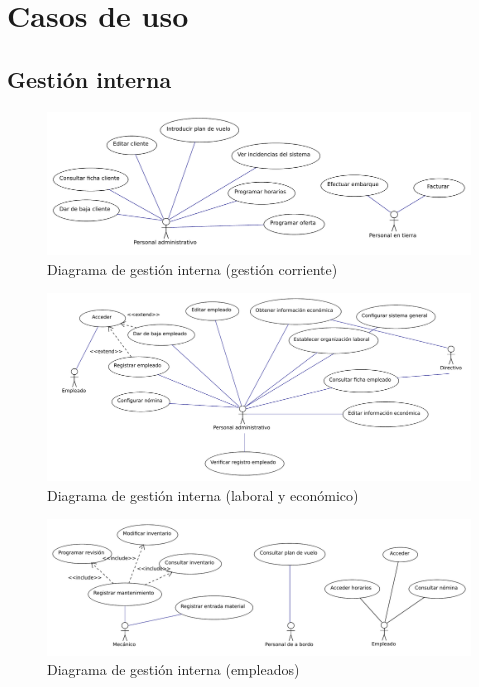 \documentclass[11pt, a4paper, twoside, titlepage]{article}
\begin{document}
	\section{Casos de uso}
	
	\subsection{Gestión interna} \vspace{.5cm}
	\iniciarnumeraciondiedral

	\ifpdf
	\begin{figure}	%
		\hspace*{0cm}\includegraphics[scale=.9]{diagramas/gicorriente.pdf}
		\caption{Diagrama de gestión interna (gestión corriente)}
	\end{figure}
	\fi

	\ifpdf
	\begin{figure}
		\hspace*{-.4cm}\includegraphics[scale=.82]{diagramas/gilaboral.pdf}
		\caption{Diagrama de gestión interna (laboral y económico)}
	\end{figure}
	\fi

	\ifpdf
	\begin{figure}
		\hspace*{-.2cm}\includegraphics[scale=.82]{diagramas/giespecificos.pdf}
		\caption{Diagrama de gestión interna (empleados)}
	\end{figure}
	\fi
\end{document}
